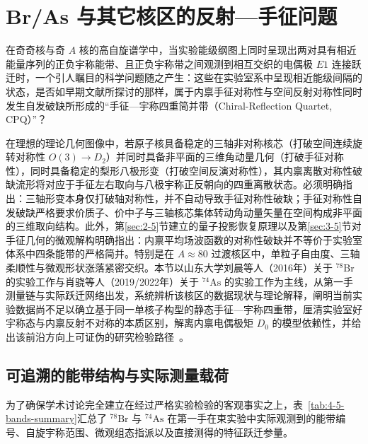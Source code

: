 \section{Br/As 与其它核区的反射---手征问题}\label{sec:4-5}

在奇奇核与奇 $A$ 核的高自旋谱学中，当实验能级纲图上同时呈现出两对具有相近能量序列的正负宇称能带、且正负宇称带之间观测到相互交织的电偶极 $E1$ 连接跃迁时，一个引人瞩目的科学问题随之产生：这些在实验室系中呈现相近能级间隔的状态，是否如早期文献所探讨的那样，属于内禀手征对称性与空间反射对称性同时发生自发破缺所形成的“手征---宇称四重简并带（Chiral-Reflection Quartet, CPQ）”？

在理想的理论几何图像中，若原子核具备稳定的三轴非对称核芯（打破空间连续旋转对称性 $O(3) \to D_2$）并同时具备非平面的三维角动量几何（打破手征对称性），同时具备稳定的梨形八极形变（打破空间反演对称性），其内禀离散对称性破缺流形将对应于手征左右取向与八极宇称正反朝向的四重离散状态。必须明确指出：三轴形变本身仅打破轴对称性，并不自动导致手征对称性破缺；手征对称性自发破缺严格要求价质子、价中子与三轴核芯集体转动角动量矢量在空间构成非平面的三维取向结构。此外，第\ref{sec:2-5}节建立的量子投影恢复原理以及第\ref{sec:3-5}节对手征几何的微观解构明确指出：内禀平均场波函数的对称性破缺并不等价于实验室体系中四条能带的严格简并。特别是在 $A \approx 80$ 过渡核区中，单粒子自由度、三轴柔顺性与微观形状涨落紧密交织。本节以山东大学刘晨等人（2016年）关于 $^{78}\mathrm{Br}$ 的实验工作与肖骁等人（2019/2022年）关于 $^{74}\mathrm{As}$ 的实验工作为主线，从第一手测量链与实际跃迁网络出发，系统辨析该核区的数据现状与理论解释，阐明当前实验数据尚不足以确立基于同一单核子构型的静态手征---宇称四重带，厘清实验室好宇称态与内禀反射不对称的本质区别，解离内禀电偶极矩 $D_0$ 的模型依赖性，并给出该前沿方向上可证伪的研究检验路径~\cite{liu-2016-octupole-correlations-multiple-chiral-doublet-bands-78br,liu-chen-2016-78br-chirality-reflection-symmetry-thesis,xiao-2022-chirality-octupole-correlations-74as,xiao-xiao-2019-high-spin-74as-thesis,butler-1996-octupole-shapes,wang-2019-rat-prm-78br-octupole-correlations}。

\subsection{可追溯的能带结构与实际测量载荷}\label{sec:4-5-1}

为了确保学术讨论完全建立在经过严格实验检验的客观事实之上，表~\ref{tab:4-5-bands-summary}汇总了 $^{78}\mathrm{Br}$ 与 $^{74}\mathrm{As}$ 在第一手在束实验中实际观测到的能带编号、自旋宇称范围、微观组态指派以及直接测得的特征跃迁参量。


